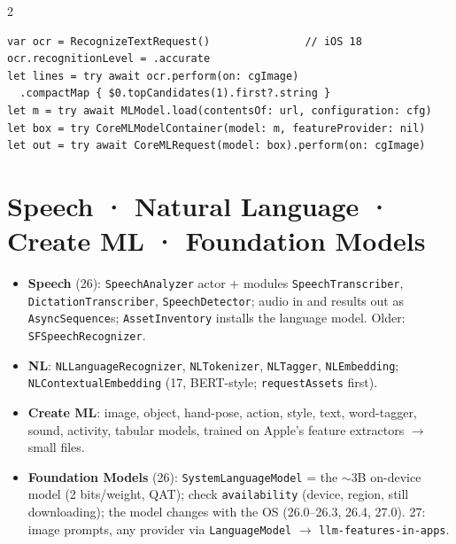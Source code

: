 \documentclass[8pt]{extarticle}
\newcommand\ct[1]{\texttt{#1}}
\begin{document}
\begin{multicols}{2}
\begin{lstlisting}[language=SwiftSheet]
var ocr = RecognizeTextRequest()               // iOS 18
ocr.recognitionLevel = .accurate
let lines = try await ocr.perform(on: cgImage)
  .compactMap { $0.topCandidates(1).first?.string }
let m = try await MLModel.load(contentsOf: url, configuration: cfg)
let box = try CoreMLModelContainer(model: m, featureProvider: nil)
let out = try await CoreMLRequest(model: box).perform(on: cgImage)
\end{lstlisting}

\section{Speech · Natural Language · Create ML · Foundation Models}
\begin{itemize}
  \item \textbf{Speech} (26): \ct{SpeechAnalyzer} actor + modules \ct{SpeechTranscriber},
        \ct{DictationTranscriber}, \ct{SpeechDetector}; audio in and results out as
        \ct{AsyncSequence}s; \ct{AssetInventory} installs the language model. Older:
        \ct{SFSpeechRecognizer}.
  \item \textbf{NL}: \ct{NLLanguageRecognizer}, \ct{NLTokenizer}, \ct{NLTagger},
        \ct{NLEmbedding}; \ct{NLContextualEmbedding} (17, BERT-style; \ct{requestAssets} first).
  \item \textbf{Create ML}: image, object, hand-pose, action, style, text, word-tagger, sound,
        activity, tabular models, trained on Apple's feature extractors $\to$ small files.
  \item \textbf{Foundation Models} (26): \ct{SystemLanguageModel} = the $\sim$3B on-device model
        (2 bits/weight, QAT); check \ct{availability} (device, region, still downloading); the
        model changes with the OS (26.0–26.3, 26.4, 27.0). 27: image prompts, any provider via
        \ct{LanguageModel} $\to$ \ct{llm-features-in-apps}.
\end{itemize}

\end{multicols}

\end{document}
